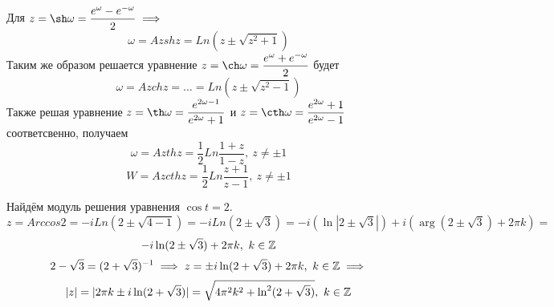 \documentclass[../../main.tex]{subfiles}
\begin{document}
Для $ z = \sh \omega = \dfrac{e^{\omega} - e^{-\omega}}{2} \implies $
\begin{equation}
\label{lec27:29}
\omega = Azsh z = Ln(z \pm \sqrt{z^2 + 1})
\end{equation}
Таким же образом решается уравнение $ z = \ch \omega = \dfrac{e^{\omega} + e^{-\omega}}{2} $ будет 
\begin{equation}
\label{lec27:30}
\omega = Azch z = \dots = Ln(z \pm \sqrt{z^2 - 1})
\end{equation}
Также решая уравнение $ z = \th 
\omega = \dfrac{e^{2\omega - 1}}{e^{2\omega} + 1} $ и 
$ z = \cth \omega = \dfrac{e^{2\omega} + 1}{e^{2\omega} - 1} $ соответсвенно,
получаем
\begin{equation}
\label{lec27:31}
\omega = Azth z = \dfrac{1}{2} Ln \dfrac{1 + z}{1 - z},\ z \neq \pm 1
\end{equation}
\begin{equation}
\label{lec27:32}
W = Azcth z = \dfrac{1}{2} Ln \dfrac{z + 1}{z - 1},\
z \neq \pm 1
\end{equation}
\begin{exmp}
	Найдём модуль решения уравнения $ \cos t = 2 $.
	\[
	z = Arccos 2 = -iLn(2 \pm \sqrt{4 - 1}) = 
	-i Ln(2 \pm \sqrt{3}) = -i (\ln|2 \pm \sqrt{3}|) + i(\arg(2 \pm \sqrt{3}) + 2\pi k) = \]\[
	-i \ln(2 \pm \sqrt{3}) + 2\pi k,\ k \in \mathbb{Z}	
	\]
	\[
	2 - \sqrt{3} = (2 + \sqrt{3})^{-1} \implies
	z = \pm i \ln (2 + \sqrt{3}) + 2\pi k,\ k \in \mathbb{Z} \implies \] \[
	|z| = |2\pi k \pm i\ln(2 + \sqrt{3})| = 
	\sqrt{4\pi^2 k^2 + \ln^2(2 + \sqrt{3})},\ k \in \mathbb{Z}
	\]
\end{exmp}
\end{document}
